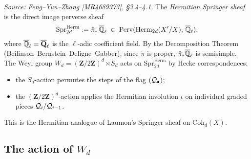 \begin{definition}
  \label{def:springer-sheaf-herm}
  \textit{Source: Feng--Yun--Zhang [MR4689373], \S3.4--4.1.}
  The \emph{Hermitian Springer sheaf} is the direct image perverse sheaf
  \[
    \mathrm{Spr}^{\mathrm{Herm}}_{2d} := \tilde\pi_*\, \overline{\mathbb{Q}}_\ell
    \;\in\; \mathrm{Perv}(\operatorname{Herm}_{2d}(X'/X),\, \overline{\mathbb{Q}}_\ell),
  \]
  where \(\overline{\mathbb{Q}}_\ell = \overline{\mathbf{Q}}_\ell\) is the \(\ell\)-adic coefficient field.
  By the Decomposition Theorem (Beilinson--Bernstein--Deligne--Gabber), since
  \(\tilde\pi\) is proper, \(\tilde\pi_*\overline{\mathbb{Q}}_\ell\) is semisimple.
  The Weyl group \(W_d = (\mathbf{Z}/2\mathbf{Z})^d \rtimes S_d\) acts on
  \(\mathrm{Spr}^{\mathrm{Herm}}_{2d}\) by Hecke correspondences:
  \begin{itemize}
    \item the \(S_d\)-action permutes the steps of the flag \((\mathcal{Q}_\bullet)\);
    \item the \((\mathbf{Z}/2\mathbf{Z})^d\)-action applies the Hermitian involution
      \(\iota\) on individual graded pieces \(\mathcal{Q}_i/\mathcal{Q}_{i-1}\).
  \end{itemize}
  This is the Hermitian analogue of Laumon's Springer sheaf on \(\mathrm{Coh}_d(X)\).
\end{definition}

\subsection{The action of $W_{d}$}

